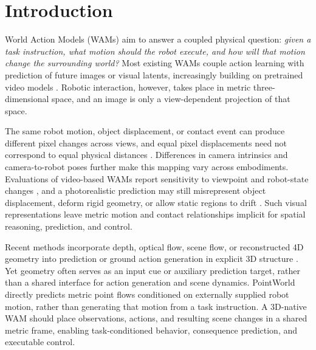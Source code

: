 \vspace{-0.2cm}
\section{Introduction}
\vspace{-0.1cm}

\label{sec:introduction}



World Action Models (WAMs) aim to answer a coupled physical question:
\emph{given a task instruction, what motion should the robot execute,
and how will that motion change the surrounding world?}
Most existing WAMs couple action learning with prediction of future
images or visual latents, increasingly building on pretrained video models
\citep{yang2023unisim,li2025uva,zhu2025uwm,cen2025worldvla,
bi2025motus,ye2026dreamzero,yuan2026fastwam,zhou2026tau0wm}.
Robotic interaction, however, takes place in metric three-dimensional
space, and an image is only a view-dependent projection of that space.

The same robot motion, object displacement, or contact event can produce
different pixel changes across views, and equal pixel displacements
need not correspond to equal physical distances
\citep{ze2024threediffusion,qu2025spatialvla}.
Differences in camera intrinsics and camera-to-robot poses further
make this mapping vary across embodiments.
Evaluations of video-based WAMs report sensitivity to viewpoint and
robot-state changes \citep{zhang2026wamgeneralization}, and a
photorealistic prediction may still misrepresent object displacement,
deform rigid geometry, or allow static regions to drift
\citep{huang2026pointworld}.
Such visual representations leave metric motion and contact relationships
implicit for spatial reasoning, prediction, and control.

Recent methods incorporate depth, optical flow, scene flow, or
reconstructed 4D geometry into prediction
\citep{zhen2025tesseract,guo2026xwam,zhao2026rynnworld,wang2026lamp}
or ground action generation in explicit 3D structure
\citep{shridhar2023peract,ze2024threediffusion,zhen2024threedvla,
qu2025spatialvla}.
Yet geometry often serves as an input cue or auxiliary prediction target,
rather than a shared interface for action generation and scene dynamics.
PointWorld~\citep{huang2026pointworld} directly predicts metric point
flows conditioned on externally supplied robot motion, rather than
generating that motion from a task instruction.
A 3D-native WAM should place observations, actions, and resulting scene
changes in a shared metric frame, enabling task-conditioned behavior,
consequence prediction, and executable control.

